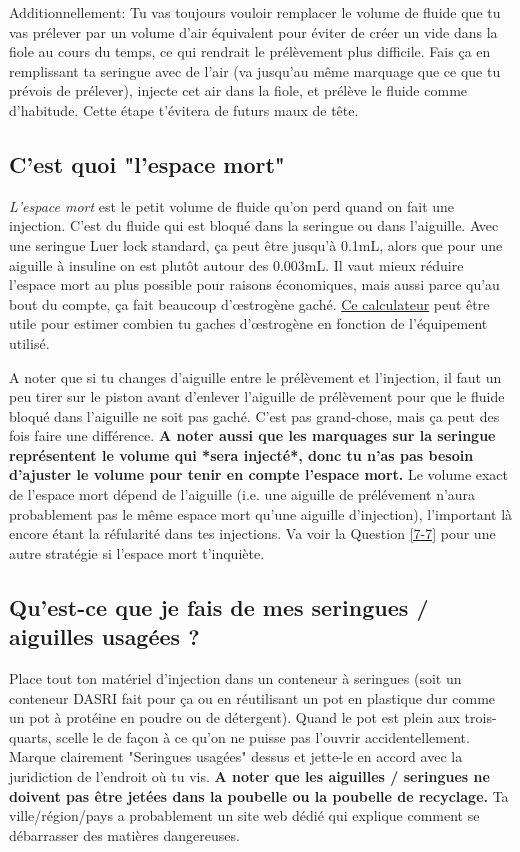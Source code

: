 \documentclass{article}
\begin{document}
Additionnellement: Tu vas toujours vouloir remplacer le volume de fluide que tu vas prélever par un volume d'air équivalent pour éviter de créer un vide dans la fiole au cours du temps, ce qui rendrait le prélèvement plus difficile. Fais ça en remplissant ta seringue avec de l'air (va jusqu'au même marquage que ce que tu prévois de prélever), injecte cet air dans la fiole, et prélève le fluide comme d'habitude. Cette étape t'évitera de futurs maux de tête.

\subsection{C'est quoi "l'espace mort"}\label{5-26}

\textit{L'espace mort} est le petit volume de fluide qu'on perd quand on fait une injection. C'est du fluide qui est bloqué dans la seringue ou dans l'aiguille. Avec une seringue Luer lock standard, ça peut être jusqu'à 0.1mL, alors que pour une aiguille à insuline on est plutôt autour des 0.003mL. Il vaut mieux réduire l'espace mort au plus possible pour raisons économiques, mais aussi parce qu'au bout du compte, ça fait beaucoup d'œstrogène gaché. \href{https://hrtcafe.net/Calc/}{Ce calculateur} peut être utile pour estimer combien tu gaches d'œstrogène en fonction de l'équipement utilisé.

A noter que si tu changes d'aiguille entre le prélèvement et l'injection, il faut un peu tirer sur le piston avant d'enlever l'aiguille de prélèvement pour que le fluide bloqué dans l'aiguille ne soit pas gaché. C'est pas grand-chose, mais ça peut des fois faire une différence. \textbf{A noter aussi que les marquages sur la seringue représentent le volume qui *sera injecté*, donc tu n'as pas besoin d'ajuster le volume pour tenir en compte l'espace mort.} Le volume exact de l'espace mort dépend de l'aiguille (i.e. une aiguille de prélévement n'aura probablement pas le même espace mort qu'une aiguille d'injection), l'important là encore étant la réfularité dans tes injections. Va voir la Question \ref{7-7} pour une autre stratégie si l'espace mort t'inquiète.

\subsection{Qu'est-ce que je fais de mes seringues / aiguilles usagées ?}\label{5-27}

Place tout ton matériel d'injection dans un conteneur à seringues (soit un conteneur DASRI fait pour ça ou en réutilisant un pot en plastique dur comme un pot à protéine en poudre ou de détergent). Quand le pot est plein aux trois-quarts, scelle le de façon à ce qu'on ne puisse pas l'ouvrir accidentellement. Marque clairement "Seringues usagées" dessus et jette-le en accord avec la juridiction de l'endroit où tu vis. \textbf{A noter que les aiguilles / seringues ne doivent pas être jetées dans la poubelle ou la poubelle de recyclage.} Ta ville/région/pays a probablement un site web dédié qui explique comment se débarrasser des matières dangereuses.
\end{document}
